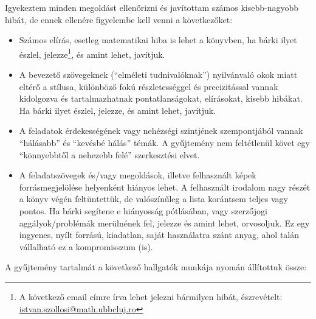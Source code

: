 \documentclass[magyar]{package/fancy-book}
\begin{document}
Igyekeztem minden megoldást ellenőrizni és javítottam számos kisebb-nagyobb
hibát, de ennek ellenére figyelembe kell venni a következőket:
\begin{itemize}
	\item Számos elírás, esetleg matematikai hiba is lehet a könyvben, ha bárki
	ilyet észlel, jelezze\footnote{A következő email címre írva lehet jelezni bármilyen hibát, észrevételt: \href{mailto:istvan.szollosi@math.ubbcluj.ro}{istvan.szollosi@math.ubbcluj.ro}}, és amint lehet, javítjuk.
	\item A bevezető szövegeknek (``elméleti tudnivalóknak'') nyilvánvaló okok
	miatt eltérő a stílusa, különböző fokú részletességgel és precizitással
	vannak kidolgozva és tartalmazhatnak pontatlanságokat, elírásokat,
	kisebb hibákat. Ha bárki ilyet észlel, jelezze, és amint lehet, javítjuk.
	\item A feladatok érdekességének vagy nehézségi szintjének szempontjából
	vannak ``hálásabb'' és ``kevésbé hálás'' témák. A gyűjtemény nem feltétlenül
	követ egy ``könnyebbtől a nehezebb felé'' szerkesztési elvet.
	\item A feladatszövegek és/vagy megoldások, illetve felhasznált képek forrásmegjelölése helyenként
	hiányos lehet. A felhasznált irodalom nagy részét a könyv végén feltüntettük, 
	de valószínűleg a lista korántsem teljes vagy pontos. Ha bárki
	segítene e hiányosság pótlásában, vagy szerzőjogi aggályok/problémák
	merülnének fel, jelezze és amint lehet, orvosoljuk. Ez egy ingyenes,
	nyílt forrású, kiadatlan, saját használatra szánt anyag, ahol talán
	vállalható ez a kompromisszum (is). 
\end{itemize}
\newpage
\thispagestyle{plain}
\noindent A gyűjtemény tartalmát a következő hallgatók munkája nyomán állítottuk össze:
\end{document}
